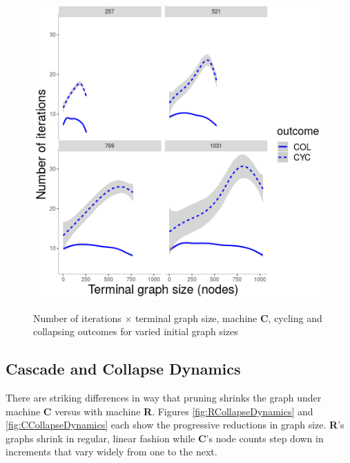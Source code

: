 \documentclass{tufte-handout}
\begin{document}
\begin{figure}
\centering
  \includegraphics{nriter-x-finnn-smooth.png} \\
  \caption{Number of iterations $\times$ terminal graph size, machine \textbf{C},
cycling and collapsing outcomes for varied initial graph sizes}
  \label{fig:NriterXFinnn}
\end{figure}

\subsection{Cascade and Collapse Dynamics}

There are striking differences in way that pruning shrinks the graph
under machine \textbf{C} versus with machine \textbf{R}.
Figures \ref{fig:RCollapseDynamics} and \ref{fig:CCollapseDynamics} each
show the progressive reductions in graph size. \textbf{R}'s graphs
shrink in regular, linear fashion while \textbf{C}'s node counts
step down in increments that vary widely from one to the next.
\end{document}
